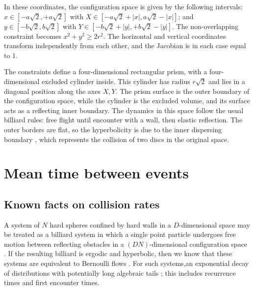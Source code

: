 \documentclass[superscriptaddress,pre,reprint,showpacs,onecolumn]{revtex4-1}
\begin{document}
In these coordinates, the configuration space is given by the following
intervals:
$x \in [-a \sqrt{2}, +a \sqrt{2}]$ with 
$X \in [-a \sqrt{2} + |x|, a \sqrt{2} - |x|]$; and 
 $y \in [-b \sqrt{2}, b \sqrt{2}]$ with $Y \in [-b \sqrt{2} + |y|, +b \sqrt{2} - |y|]$.
The non-overlapping constraint becomes $x^2 + y^2 \ge 2 r^2$.
The horizontal and vertical coordinates transform independently
from each other, and the Jacobian is in each case equal to $1$.

The constraints define a four-dimensional
rectangular prism, with a four-dimensional excluded cylinder inside.
This cylinder has radius $r\sqrt{2}$ and lies
in  a diagonal position along the axes $X, Y$.
The prism surface is the outer boundary of the configuration space,
while the cylinder is the excluded volume, and its surface
acts as a reflecting inner boundary.
The dynamics in this space follow
the usual billiard rules: free flight until
encounter with a wall, then elastic reflection.
The outer borders are flat, so the
hyperbolicity is due to the inner dispersing
boundary \cite{Sim99}, which represents the collision of
two discs in the original space.


\section{Mean time between events}


\subsection{Known facts on collision rates}

A system of $N$ hard spheres confined by hard walls in a $D$-dimensional
space may be treated as a billiard system 
in which a single point  particle undergoes free motion between reflecting obstacles 
in a $ (D N) $-dimensional configuration space \cite{Sinai70, Sim99, MarkChern}. 
If the resulting billiard is ergodic and hyperbolic, then we know that
these systems are equivalent to Bernoulli flows \cite{Gallavotti74}.
For such systems,an exponential decay of 
distributions \cite{AbadiGalves} with potentially
long algebraic tails \cite{ZasTip};
this includes recurrence times and
first encounter times. 
\end{document}
